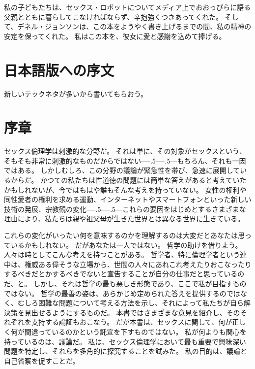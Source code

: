 \documentclass[paper=a4,book,openany]{jlreq}
\def\DDASH{―\kern-.5\zw―\kern-.5\zw―}
\begin{document}
私の子どもたちは、セックス・ロボットについてメディア上でおおっぴらに語る父親とともに暮らしてこなければならず、辛抱強くつきあってくれた。
そして、デネル・ジョンソンは、この本をようやく書き上げるまでの間、私の精神の安定を保ってくれた。
私はこの本を、彼女に愛と感謝を込めて捧げる。

\chapter*{日本語版への序文}

新しいテックネタが多いから書いてもらおう。
\fi
\mainmatter

\chapter*{序章}
{}

セックス倫理学は刺激的な分野だ。
それは単に、その対象がセックスという、そもそも非常に刺激的なものだからではない{\DDASH}もちろん、それも一因ではある。
しかしむしろ、この分野の議論が緊急性を帯び、急速に展開しているからだ。
かつての私たちは性道徳の問題には簡単な答えがあると考えていたかもしれないが、今ではもはや誰もそんな考えを持っていない。
女性の権利や同性愛者の権利を求める運動、インターネットやスマートフォンといった新しい技術の発展、宗教観の変化{\DDASH}これらの要因をはじめとするさまざまな理由により、私たちは親や祖父母が生きた世界とは異なる世界に生きている。

これらの変化がいったい何を意味するのかを理解するのは大変だとあなたは思っているかもしれない。
だがあなたは一人ではない。
哲学の助けを借りよう。
人々は時としてこんな考えを持つことがある。
哲学者、特に倫理学者という連中は、権威ある偉そうな立場から、世間の人々にあれこれ考えたりおこなったりするべきだとかするべきでないと宣告することが自分の仕事だと思っているのだ、と。
しかし、それは哲学の最も悪しき形態であり、ここで私が目指すものではない。
哲学の最善の姿は、あらかじめ定められた答えを提供するのではなく、むしろ困難な問題について考える方法を示し、それによって私たちが自ら解決策を見出せるようにするものだ。
本書ではさまざまな意見を紹介し、そのそれぞれを支持する論証もおこなう。
だが本書は、セックスに関して、何が正しく何が間違っているのかという託宣を下すものではない。
私が何よりも関心を持っているのは、議論だ。
私は、セックス倫理学において最も重要で興味深い問題を特定し、それらを多角的に探究することを試みた。
私の目的は、議論と自己省察を促すことだ。
\end{document}
